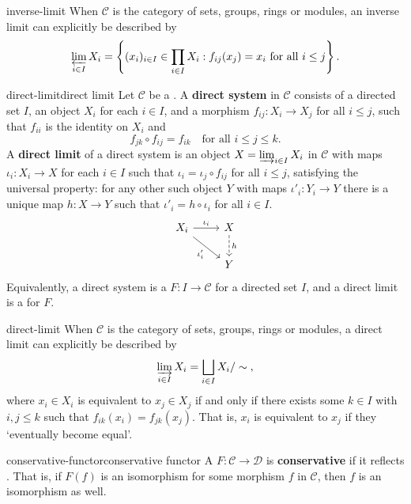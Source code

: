 \begin{example}{inverse-limit}
    When $\mathcal{C}$ is the category of sets, groups, rings or modules, an inverse limit can explicitly be described by
    \[ \varprojlim_{i \in I} X_i = \left\{ (x_i)_{i \in I} \in \prod_{i \in I} X_i : f_{ij}(x_j) = x_i \text{ for all } i \le j \right\} . \]
\end{example}

\begin{topic}{direct-limit}{direct limit}
    Let $\mathcal{C}$ be a . A \textbf{direct system} in $\mathcal{C}$ consists of a directed set $I$, an object $X_i$ for each $i \in I$, and a morphism $f_{ij} : X_i \to X_j$ for all $i \le j$, such that $f_{ii}$ is the identity on $X_i$ and
    \[ f_{jk} \circ f_{ij} = f_{ik} \quad \text{for all } i \le j \le k . \]
    A \textbf{direct limit} of a direct system is an object $X = \varinjlim_{i \in I} X_i$ in $\mathcal{C}$ with maps $\iota_i : X_i \to X$ for each $i \in I$ such that $\iota_i = \iota_j \circ f_{ij}$ for all $i \le j$, satisfying the universal property: for any other such object $Y$ with maps $\iota'_i : Y_i \to Y$ there is a unique map $h : X \to Y$ such that $\iota'_i = h \circ \iota_i$ for all $i \in I$.
    \[ \begin{tikzcd} X_i \arrow{r}{\iota_i} \arrow[swap]{dr}{\iota'_i} & X \arrow[dashed]{d}{h} \\ & Y \end{tikzcd} \]
    Equivalently, a direct system is a  $F : I \to \mathcal{C}$ for a directed set $I$, and a direct limit is a  for $F$.
\end{topic}

\begin{example}{direct-limit}
    When $\mathcal{C}$ is the category of sets, groups, rings or modules, a direct limit can     explicitly be described by
    \[ \varinjlim_{i \in I} X_i = \bigsqcup_{i \in I} X_i / \sim{} , \]
    where $x_i \in X_i$ is equivalent to $x_j \in X_j$ if and only if there exists some $k \in I$ with $i, j \le k$ such that $f_{ik}(x_i) = f_{jk}(x_j)$. That is, $x_i$ is equivalent to $x_j$ if they `eventually become equal'.
\end{example}

\begin{topic}{conservative-functor}{conservative functor}
    A  $F : \mathcal{C} \to \mathcal{D}$ is \textbf{conservative} if it reflects . That is, if $F(f)$ is an isomorphism for some morphism $f$ in $\mathcal{C}$, then $f$ is an isomorphism as well.
\end{topic}

